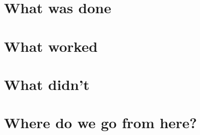 \section{What was done}\label{what-was-done}

\section{What worked}\label{what-worked}

\section{What didn't}\label{what-didnt}

\section{Where do we go from here?}\label{where-do-we-go-from-here}

